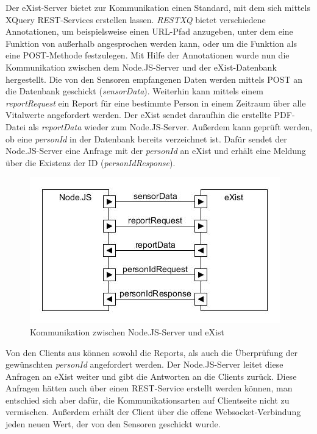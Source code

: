 \newpage
Der eXist-Server bietet zur Kommunikation einen Standard, mit dem sich mittels XQuery REST-Services erstellen lassen. \textit{RESTXQ} bietet verschiedene Annotationen, um beispielsweise einen URL-Pfad anzugeben, unter dem eine Funktion von außerhalb angesprochen werden kann, oder um die Funktion als eine POST-Methode festzulegen. Mit Hilfe der Annotationen wurde nun die Kommunikation zwischen dem Node.JS-Server und der eXist-Datenbank hergestellt. Die von den Sensoren empfangenen Daten werden mittels POST an die Datenbank geschickt (\textit{sensorData}). Weiterhin kann mittels einem \textit{reportRequest} ein Report für eine bestimmte Person in einem Zeitraum über alle Vitalwerte angefordert werden. Der eXist sendet daraufhin die erstellte PDF-Datei als \textit{reportData} wieder zum Node.JS-Server. Außerdem kann geprüft werden, ob eine \textit{personId} in der Datenbank bereits verzeichnet ist. Dafür sendet der Node.JS-Server eine Anfrage mit der \textit{personId} an eXist und erhält eine Meldung über die Existenz der ID (\textit{personIdResponse}).

\begin{figure}[h]
\begin{center}
\includegraphics[scale=0.6]{images/komm2.jpg} 
\caption{Kommunikation zwischen Node.JS-Server und eXist}
\end{center}
\end{figure}

Von den Clients aus können sowohl die Reports, als auch die Überprüfung der gewünschten \textit{personId} angefordert werden. Der Node.JS-Server leitet diese Anfragen an eXist weiter und gibt die Antworten an die Clients zurück. Diese Anfragen hätten auch über einen REST-Service erstellt werden können, man entschied sich aber dafür, die Kommunikationsarten auf Clientseite nicht zu vermischen. Außerdem erhält der Client über die offene Websocket-Verbindung jeden neuen Wert, der von den Sensoren geschickt wurde.  \\ \\

